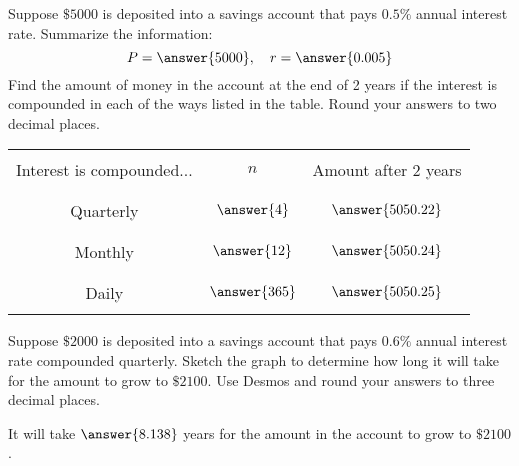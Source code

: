 \documentclass{ximera}
\begin{document}
  \begin{problem}\label{prob:160hom7prob4} 
  Suppose $\$5000$ is deposited into a savings account that pays $0.5\%$ annual interest rate.  
  Summarize the information:
  $$P=\answer{5000},\quad r=\answer{0.005}$$
  Find the amount of money in the account at the end of 2 years if the interest is compounded in each of the ways listed in the table.  Round your answers to two decimal places.
  \begin{center}
\begin{tabular}{|c|c|c|}
 \hline
 &&   \\
 Interest is compounded... & $n$ & Amount after 2 years \\
 &&  \\
  \hline
  &&  \\
 Quarterly & $\answer{4}$ & $\answer{5050.22}$ \\
  && \\
 \hline
  &&  \\
 Monthly & $\answer{12}$ & $\answer{5050.24}$ \\
  && \\
 \hline
  &&  \\
 Daily & $\answer{365}$ & $\answer{5050.25}$ \\
  && \\
 \hline
 \end{tabular}
\end{center}    
  \end{problem}
  
  \begin{problem}\label{prob:160hom7prob5} 
  Suppose $\$2000$ is deposited into a savings account that pays $0.6\%$ annual interest rate compounded quarterly.  Sketch the graph to determine how long it will take for the amount to grow to  $\$2100$.  Use Desmos and round your answers to three decimal places.
  
  \begin{center}  
\end{center}

It will take $\answer{8.138}$ years for the amount in the account to grow to $\$2100$.  
  \end{problem}
  
\end{document}
